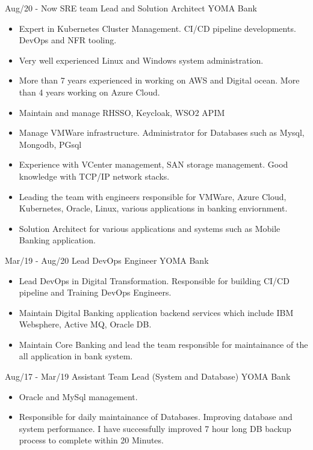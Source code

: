 \documentclass[]{friggeri-cv}
\begin{document}
\begin{entrylist}
  \entry
    {Aug/20 - Now}
    {SRE team Lead and Solution Architect}
    {YOMA Bank}
    { \begin{itemize}
      \item Expert in Kubernetes Cluster Management. CI/CD pipeline developments. DevOps and NFR tooling.
      \item Very well experienced Linux and Windows system administration.
      \item More than 7 years experienced in working on AWS and Digital ocean. More than 4 years working on Azure Cloud.
      \item Maintain and manage RHSSO, Keycloak, WSO2 APIM
      \item Manage VMWare infrastructure. Administrator for Databases such as Mysql, Mongodb, PGsql
      \item Experience with VCenter management, SAN storage management. Good knowledge with TCP/IP network stacks.
      \item Leading the team with engineers responsible for VMWare, Azure Cloud, Kubernetes, Oracle, Linux, various applications in banking enviornment.
      \item Solution Architect for various applications and systems such as Mobile Banking application.
      \end{itemize}
    }
  \entry
    {Mar/19 - Aug/20}
    {Lead DevOps Engineer}
    {YOMA Bank}
    { \begin{itemize}
        \item Lead DevOps in Digital Transformation. Responsible for building CI/CD pipeline and Training DevOps Engineers.
        \item Maintain Digital Banking application backend services which include IBM Websphere, Active MQ, Oracle DB.
        \item Maintain Core Banking and lead the team responsible for maintainance of the all application in bank system.
      \end{itemize}
    }
  \entry
    {Aug/17 - Mar/19}
    {Assistant Team Lead (System and Database)}
    {YOMA Bank}
    {
      \begin{itemize}
        \item Oracle and MySql management.
        \item Responsible for daily maintainance of Databases. Improving database and system performance. I have successfully improved 7 hour long DB backup process to complete within 20 Minutes.
      \end{itemize}
}
\end{entrylist}
\end{document}
